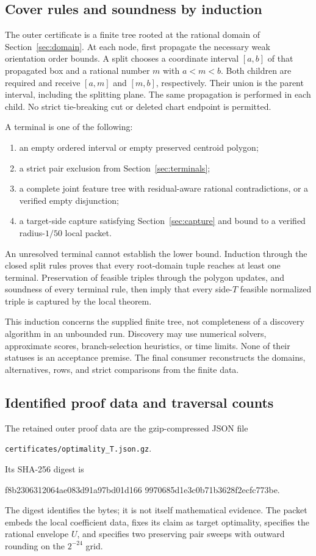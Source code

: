 \documentclass[11pt]{article}
\begin{document}
\subsection{Cover rules and soundness by induction}

The outer certificate is a finite tree rooted at the rational domain of Section~\ref{sec:domain}. At each node, first propagate the necessary weak orientation order bounds. A split chooses a coordinate interval $[a,b]$ of that propagated box and a rational number $m$ with $a<m<b$. Both children are required and receive $[a,m]$ and $[m,b]$, respectively. Their union is the parent interval, including the splitting plane. The same propagation is performed in each child. No strict tie-breaking cut or deleted chart endpoint is permitted.

A terminal is one of the following:
\begin{enumerate}
 \item an empty ordered interval or empty preserved centroid polygon;
 \item a strict pair exclusion from Section~\ref{sec:terminals};
 \item a complete joint feature tree with residual-aware rational contradictions, or a verified empty disjunction;
 \item a target-side capture satisfying Section~\ref{sec:capture} and bound to a verified radius-$1/50$ local packet.
\end{enumerate}
An unresolved terminal cannot establish the lower bound. Induction through the closed split rules proves that every root-domain tuple reaches at least one terminal. Preservation of feasible triples through the polygon updates, and soundness of every terminal rule, then imply that every side-$T$ feasible normalized triple is captured by the local theorem.

This induction concerns the supplied finite tree, not completeness of a discovery algorithm in an unbounded run. Discovery may use numerical solvers, approximate scores, branch-selection heuristics, or time limits. None of their statuses is an acceptance premise. The final consumer reconstructs the domains, alternatives, rows, and strict comparisons from the finite data.

\subsection{Identified proof data and traversal counts}

The retained outer proof data are the gzip-compressed JSON file
\begin{center}
\texttt{certificates/optimality\_T.json.gz}.
\end{center}
Its SHA-256 digest is
\begin{center}\small\ttfamily
f8b2306312064ae083d91a97bd01d166\linebreak
9970685d1e3c0b71b3628f2ecfc773be.
\end{center}
The digest identifies the bytes; it is not itself mathematical evidence. The packet embeds the local coefficient data, fixes its claim as target optimality, specifies the rational envelope $U$, and specifies two preserving pair sweeps with outward rounding on the $2^{-24}$ grid.
\end{document}
